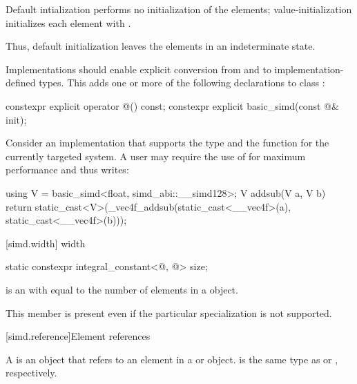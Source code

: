 \pnum
Default intialization performs no initialization of the elements; value-initialization initializes each element with . \begin{note}Thus, default initialization leaves the elements in an indeterminate state.\end{note}

\pnum
Implementations should enable explicit conversion from and to implementation-defined types. This adds one or more of the following declarations to class :

\begin{codeblock}
constexpr explicit operator @\impdef@() const;
constexpr explicit basic_simd(const @\impdef@& init);
\end{codeblock}

\begin{example}
  Consider an implementation that supports the type  and the function  for the currently targeted system.
  A user may require the use of  for maximum performance and thus writes:
  \begin{codeblock}
    using V = basic_simd<float, simd_abi::__simd128>;
    V addsub(V a, V b) {
      return static_cast<V>(_vec4f_addsub(static_cast<__vec4f>(a), static_cast<__vec4f>(b)));
    }
  \end{codeblock}
\end{example}

[simd.width]{ width}

\begin{itemdecl}
static constexpr integral_constant<@\simdsizetype@, @\seebelow@> size;
\end{itemdecl}

\begin{itemdescr}
    \pnum {} is an  with  equal to the number of elements in a  object.
    \pnum \begin{note}This member is present even if the particular  specialization is not supported.\end{note}
\end{itemdescr}

[simd.reference]{Element references}

\pnum
A  is an object that refers to an element in a  or  object.  is the same type as  or , respectively.

